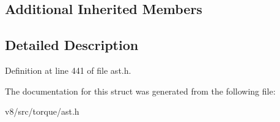 \subsection*{Additional Inherited Members}


\subsection{Detailed Description}


Definition at line 441 of file ast.\+h.



The documentation for this struct was generated from the following file\+:\begin{DoxyCompactItemize}
\item 
v8/src/torque/ast.\+h\end{DoxyCompactItemize}

